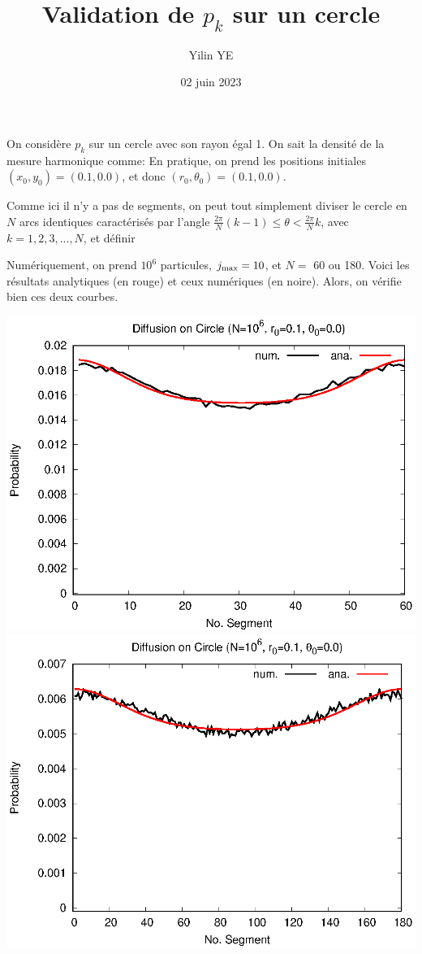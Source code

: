 \documentclass[12pt, oneside]{article}   	%
\title{Validation de $p_k$ sur un cercle}
\author{Yilin YE}
\date{02 juin 2023}							%
\begin{document}
\maketitle


On considère $p_k$ sur un cercle avec son rayon égal 1. 
On sait la densité de la mesure harmonique comme:
En pratique, on prend les positions initiales $(x_0,y_0) = (0.1,0.0)$, et donc $(r_0,\theta_0) = (0.1,0.0)$.


Comme ici il n'y a pas de segments, on peut tout simplement diviser le cercle en $N$ arcs identiques caractérisés par l'angle $\frac{2\pi}{N} (k-1) \le \theta < \frac{2\pi}{N} k$, avec $k = 1,2,3,...,N$, et définir


Numériquement, on prend $10^6$ particules, $j_{\mathrm{max}}=10$, et $N = $ 60 ou 180. Voici les résultats analytiques (en rouge) et ceux numériques (en noire). Alors, on vérifie bien ces deux courbes.


\begin{center}
\includegraphics[width=0.48\linewidth]{pbb_cc_N60.eps}
\includegraphics[width=0.48\linewidth]{pbb_cc_N180.eps}
\end{center}
\end{document}
